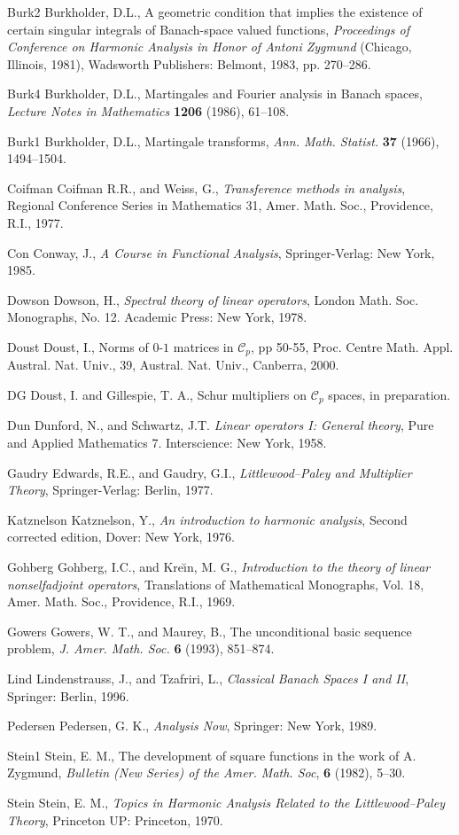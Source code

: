 \documentclass[12pt]{UNSWthesis}
\newcommand{\CC}{\mathcal{C}}
\numberwithin{equation}{section}
\begin{document}
\begin{thebibliography}{999}
\bibitem
{Burk2} Burkholder, D.L.,
A geometric condition that implies the existence of certain singular integrals
of Banach-space valued functions,
\textit{Proceedings of Conference on Harmonic Analysis in Honor of Antoni
Zygmund} (Chicago, Illinois, 1981), Wadsworth Publishers: Belmont,
1983, pp. 270--286.

\bibitem
{Burk4} Burkholder, D.L.,
Martingales and Fourier analysis in Banach spaces,
\textit{Lecture Notes in Mathematics} \textbf{1206} (1986), 61--108.

\bibitem
{Burk1} Burkholder, D.L.,
Martingale transforms,
\textit{Ann. Math. Statist.} \textbf{37} (1966), 1494--1504.

\bibitem
{Coifman} Coifman R.R., and Weiss, G.,
\textit{Transference methods in analysis},
Regional Conference Series in Mathematics 31,
Amer. Math. Soc., Providence, R.I., 1977.

\bibitem
{Con} Conway, J.,
\textit{A Course in Functional Analysis},
Springer-Verlag: New York, 1985.

\bibitem
{Dowson} Dowson, H.,
\textit{Spectral theory of linear operators},
London Math. Soc. Monographs, No. 12. Academic Press: New York, 1978.

\bibitem
{Doust} 
Doust, I., Norms of $0$-$1$ matrices in $\CC_p$,  pp 50-55, Proc.
Centre Math. Appl. Austral. Nat. Univ., 39, Austral. Nat. Univ.,
Canberra, 2000.

\bibitem
{DG} Doust, I.  and Gillespie, T. A.,
Schur multipliers on $\CC_p$ spaces,
in preparation.

\bibitem
{Dun} Dunford, N., and Schwartz, J.T.
\textit{Linear operators I: General theory},
Pure and Applied Mathematics 7. Interscience: New York, 1958.

\bibitem
{Gaudry} Edwards, R.E., and Gaudry, G.I.,
\textit{Littlewood--Paley and Multiplier Theory},
Springer-Verlag: Berlin, 1977.

\bibitem
{Katznelson}
Katznelson, Y.,
\textit{An introduction to harmonic analysis},
Second corrected edition, Dover: New York, 1976.

\bibitem
{Gohberg}
Gohberg, I.C., and Kre\u{\i}n, M. G.,
\textit{Introduction to the theory of linear nonselfadjoint operators},
Translations of Mathematical Monographs, Vol. 18, Amer. Math. Soc.,
Providence, R.I., 1969.

\bibitem
{Gowers} Gowers, W. T., and Maurey, B.,
The unconditional basic sequence problem,
\textit{J. Amer. Math. Soc.} \textbf{6} (1993), 851--874.

\bibitem
{Lind}
Lindenstrauss, J., and Tzafriri, L.,
\textit{Classical Banach Spaces I and II},
Springer: Berlin, 1996.

\bibitem
{Pedersen}
Pedersen, G. K.,
\textit{Analysis Now},
Springer: New York, 1989.

\bibitem
{Stein1}
Stein, E. M.,
The development of square functions in the work of A. Zygmund,
\textit{Bulletin (New Series) of the Amer. Math. Soc},
\textbf{6} (1982), 5--30.

\bibitem
{Stein}
Stein, E. M.,
\textit{Topics in Harmonic Analysis Related to the Littlewood--Paley Theory},
Princeton UP: Princeton, 1970.

\end{thebibliography}
\end{document}
